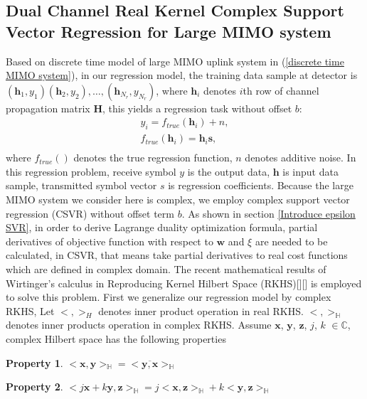 \documentclass[12pt, draftclsnofoot, onecolumn]{IEEEtran}
\begin{document}
\begin{spacing}{2}
 
\section{Dual Channel Real Kernel Complex Support Vector Regression for Large MIMO system}\label{dual channel CSVR}
 Based on discrete time model of large MIMO uplink system in (\ref{discrete time MIMO system}), in our  regression model, the training data sample at detector is $(\mathbf{h}_{1}, y_{1})(\mathbf{h}_{2}, y_{2}), \ldots, (\mathbf{h}_{N_{r}}, y_{N_{r}})$, where $\mathbf{h}_{i}$ denotes $i$th row of channel propagation matrix $\mathbf{H}$, this yields a regression task without offset $b$:  
 \begin{eqnarray}
 y_{i}=f_{true}(\mathbf{h}_{i})+n,\\
 \label{regression part1a}
 f_{true}(\mathbf{h}_{i})=\mathbf{h}_{i}\mathbf{s},\\
 \label{regression part1b}
 \end{eqnarray}
 where $f_{true}()$ denotes the true regression function, $n$ denotes additive noise.
In this regression problem, receive symbol $y$ is the output data, $\mathbf{h}$ is input data sample, transmitted symbol vector $s$ is regression coefficients. Because the large MIMO system we consider here is complex, we employ complex support vector regression (CSVR) without offset term $b$. As shown in section \ref{Introduce epsilon SVR}, in order to derive Lagrange duality optimization formula, partial derivatives of objective function with respect to $\mathbf{w}$ and $\xi$ are needed to be calculated, in CSVR, that means take partial derivatives to real cost functions which are defined in complex domain. The recent mathematical results of Wirtinger's calculus in Reproducing Kernel Hilbert Space (RKHS)[\cite{wirtinger's calculus}][\cite {reproducing Kernel Hilbert Space}] is employed to solve this problem. First we generalize our regression model by complex RKHS, 
Let $<,>_{H}$ denotes inner product operation in real RKHS. $<,>_{\mathbb{H}}$ denotes inner products operation in complex RKHS. Assume $\mathbf{x}$, $\mathbf{y}$, $\mathbf{z}$, $j$, $k$ $\in \mathbb{C}$, complex Hilbert space has the following properties 
\newtheorem{Lemma}{Lemma}
\newtheorem{Property}{Property}
\begin{Property}
 $<\mathbf{x},\mathbf{y}>_{\mathbb{H}}=<\overline{\mathbf{y},\mathbf{x}}>_{\mathbb{H}}$
\label{CHSProperty1}
\end{Property}

\begin{Property}
$<j\mathbf{x}+k\mathbf{y},\mathbf{z}>_{\mathbb{H}}=j<\mathbf{x},\mathbf{z}>_{\mathbb{H}}+k<\mathbf{y},\mathbf{z}>_{\mathbb{H}}$
\label{CHSProperty2}
\end{Property}


\end{spacing}
\end{document}
